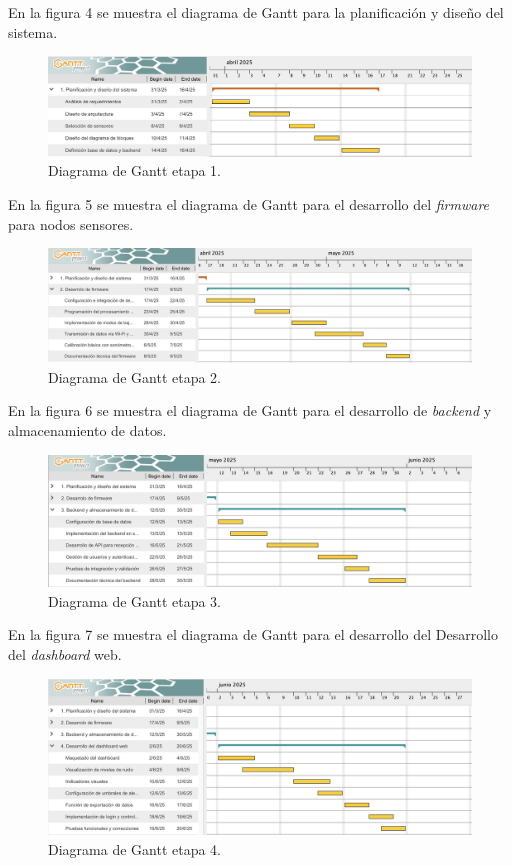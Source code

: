 \documentclass[
11pt, %
]{charter}
\begin{document}
En la figura 4 se muestra el diagrama de Gantt para la planificación y diseño del sistema.
\begin{figure}[htpb]
    \centering 
    \includegraphics[width=1.05\textwidth]{./Figuras/gantt2.png}
    \caption{Diagrama de Gantt etapa 1.}
    \label{fig:AoN}
    \end{figure}

En la figura 5 se muestra el diagrama de Gantt para el desarrollo del \textit{firmware} para nodos sensores.
\begin{figure}[htpb]
    \centering 
    \includegraphics[width=1.05\textwidth]{./Figuras/gantt3.png}
    \caption{Diagrama de Gantt etapa 2.}
    \label{fig:AoN}
    \end{figure}

    \newpage

En la figura 6 se muestra el diagrama de Gantt para el desarrollo de \textit{backend} y almacenamiento de datos.
\begin{figure}[htpb]
    \centering 
    \includegraphics[width=1.05\textwidth]{./Figuras/gantt4.png}
    \caption{Diagrama de Gantt etapa 3.}
    \label{fig:AoN}
    \end{figure}

En la figura 7 se muestra el diagrama de Gantt para el desarrollo del Desarrollo del \textit{dashboard} web.
\begin{figure}[htpb]
    \centering 
    \includegraphics[width=1.05\textwidth]{./Figuras/gantt5.png}
    \caption{Diagrama de Gantt etapa 4.}
    \label{fig:AoN}
    \end{figure}
\end{document}
